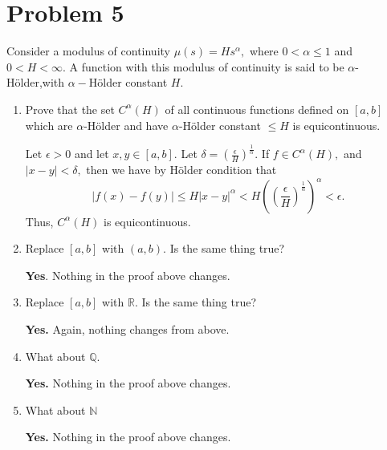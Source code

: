 \documentclass[11pt]{article}
\newcommand{\bbN}{\mathbb{N}}
\newcommand{\bbQ}{\mathbb{Q}}
\newcommand{\bbR}{\mathbb{R}}
\begin{document}
\section*{Problem 5}
\begin{problem}
    Consider a modulus of continuity $\mu(s) = Hs^\alpha,$ where $0 < \alpha \leq 1$ and $0< H < \infty.$ A function with this modulus of continuity is said to be $\alpha$-H\"{o}lder,with  $\alpha-$H\"{o}lder constant $H.$
\end{problem}
\begin{enumerate}
    \item 
    \begin{problem}
        Prove that the set $C^\alpha(H)$ of all continuous functions defined on $[a,b]$ which
 are $\alpha$-H\"{o}lder and have $\alpha$-H\"{o}lder constant $\leq H$ is equicontinuous.
    \end{problem}
    \begin{solution}
        Let $\epsilon>0$ and let $x,y \in [a,b].$ Let $\delta = (\frac{\epsilon}{H})^\frac{1}{\alpha}.$ If $f\in C^\alpha(H),$ and $|x-y|< \delta,$ then we have by H\"{o}lder condition that
        \[|f(x)-f(y)|\leq H|x-y|^\alpha < H\left((\frac{\epsilon}{H})^\frac{1}{\alpha}\right)^\alpha< \epsilon.\] Thus, $C^\alpha(H)$ is equicontinuous.
    \end{solution}
    \item 
    \begin{problem}
        Replace $[a,b]$ with $(a,b).$ Is the same thing true?
    \end{problem}
    \begin{solution}
        \textbf{Yes}. Nothing in the proof above changes.
    \end{solution}
    \item 
    \begin{problem}
        Replace $[a,b]$ with $\bbR.$ Is the same thing true?
    \end{problem}
    \begin{solution}
        \textbf{Yes.} Again, nothing changes from above. 
    \end{solution}
    \item 
    \begin{problem}
        What about $\bbQ.$
    \end{problem}
    \begin{solution}
        \textbf{Yes.} Nothing in the proof above changes.
    \end{solution}
    \item 
    \begin{problem}
        What about $\bbN$
    \end{problem}
    \begin{solution}
        \textbf{Yes.}  Nothing in the proof above changes.
    \end{solution}
\end{enumerate}
\end{document}
